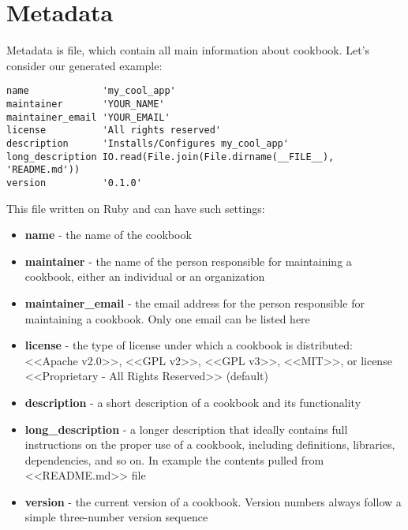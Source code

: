 \section{Metadata}

Metadata is file, which contain all main information about cookbook. Let's consider our generated example:

\begin{lstlisting}[label=lst:cookbook-metadata1,title=my-server-cloud/site-cookbooks/my\_cool\_app/metadata.rb]
name             'my_cool_app'
maintainer       'YOUR_NAME'
maintainer_email 'YOUR_EMAIL'
license          'All rights reserved'
description      'Installs/Configures my_cool_app'
long_description IO.read(File.join(File.dirname(__FILE__), 'README.md'))
version          '0.1.0'
\end{lstlisting}

This file written on Ruby and can have such settings:

\begin{itemize}
  \item \textbf{name} - the name of the cookbook
  \item \textbf{maintainer} - the name of the person responsible for maintaining a cookbook, either an individual or an organization
  \item \textbf{maintainer\_email} - the email address for the person responsible for maintaining a cookbook. Only one email can be listed here
  \item \textbf{license} - the type of license under which a cookbook is distributed: <<Apache v2.0>>, <<GPL v2>>, <<GPL v3>>, <<MIT>>, or license <<Proprietary - All Rights Reserved>> (default)
  \item \textbf{description} - a short description of a cookbook and its functionality
  \item \textbf{long\_description} - a longer description that ideally contains full instructions on the proper use of a cookbook, including definitions, libraries, dependencies, and so on. In example the contents pulled from <<README.md>> file
  \item \textbf{version} - the current version of a cookbook. Version numbers always follow a simple three-number version sequence
\end{itemize}
